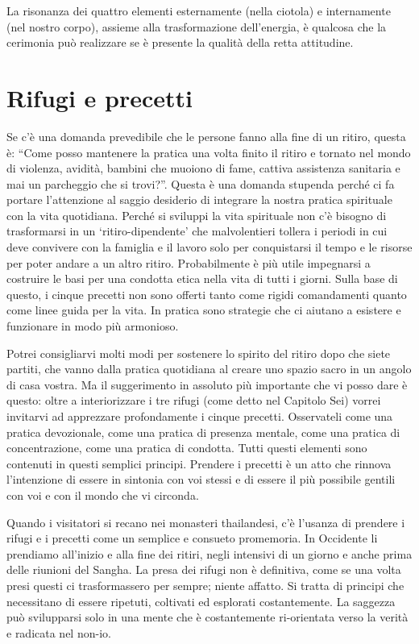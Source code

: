 La risonanza dei quattro elementi esternamente (nella ciotola) e internamente (nel nostro corpo), assieme alla trasformazione dell'energia, è qualcosa che la cerimonia può realizzare se è presente la qualità della retta attitudine.

\section*{Rifugi e precetti}

\vspace*{-0.8em}
Se c'è una domanda prevedibile che le persone fanno alla fine di un ritiro, questa è: ``Come posso mantenere la pratica una volta finito il ritiro e tornato nel mondo di violenza, avidità, bambini che muoiono di fame, cattiva assistenza sanitaria e mai un parcheggio che si trovi?''. Questa è una domanda stupenda perché ci fa portare l'attenzione al saggio desiderio di integrare la nostra pratica spirituale con la vita quotidiana. Perché si sviluppi la vita spirituale non c'è bisogno di trasformarsi in un `ritiro-dipendente' che malvolentieri tollera i periodi in cui deve convivere con la famiglia e il lavoro solo per conquistarsi il tempo e le risorse per poter andare a un altro ritiro. Probabilmente è più utile impegnarsi a costruire le basi per una condotta etica nella vita di tutti i giorni. Sulla base di questo, i cinque precetti non sono offerti tanto come rigidi comandamenti quanto come linee guida per la vita. In pratica sono strategie che ci aiutano a esistere e funzionare in modo più armonioso.

Potrei consigliarvi molti modi per sostenere lo spirito del ritiro dopo che siete partiti, che vanno dalla pratica quotidiana al creare uno spazio sacro in un angolo di casa vostra. Ma il suggerimento in assoluto più importante che vi posso dare è questo: oltre a interiorizzare i tre rifugi (come detto nel Capitolo Sei) vorrei invitarvi ad apprezzare profondamente i cinque precetti. Osservateli come una pratica devozionale, come una pratica di presenza mentale, come una pratica di concentrazione, come una pratica di condotta. Tutti questi elementi sono contenuti in questi semplici principi. Prendere i precetti è un atto che rinnova l'intenzione di essere in sintonia con voi stessi e di essere il più possibile gentili con voi e con il mondo che vi circonda. 

Quando i visitatori si recano nei monasteri thailandesi, c'è l'usanza di prendere i rifugi e i precetti come un semplice e consueto promemoria. In Occidente li prendiamo all'inizio e alla fine dei ritiri, negli intensivi di un giorno e anche prima delle riunioni del Sangha. La presa dei rifugi non è definitiva, come se una volta presi questi ci trasformassero per sempre; niente affatto. Si tratta di principi che necessitano di essere ripetuti, coltivati ed esplorati costantemente. La saggezza può svilupparsi solo in una mente che è costantemente ri-orientata verso la verità e radicata nel non-io.

